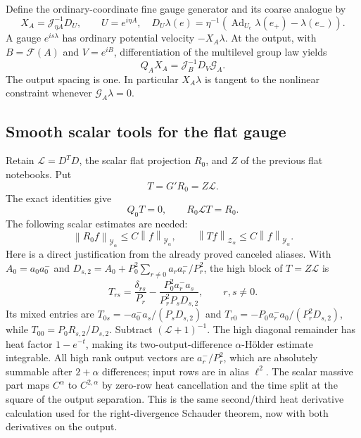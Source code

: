\documentclass[11pt]{article}
\theoremstyle{remark}
\newcommand{\norm}[1]{\left\|#1\right\|}
\begin{document}
Define the ordinary-coordinate fine gauge generator and its
coarse analogue by
\begin{equation}\label{ng-generators}
 X_A=\mathcal J_{\eta A}^{-1}D_U,
 \qquad U=e^{i\eta A},\quad
 D_U\lambda(e)=\eta^{-1}
       (\operatorname{Ad}_{U_e}\lambda(e_+)-\lambda(e_-)).
\end{equation}
A gauge $e^{is\lambda}$ has ordinary potential velocity
$-X_A\lambda$. At the output, with $B=\mathcal F(A)$ and
$V=e^{iB}$, differentiation of the multilevel group law yields
\begin{equation}\label{ng-gauge-intertwining}
 Q_AX_A=\mathcal J_B^{-1}D_V\mathcal G_A.
\end{equation}
The output spacing is one. In particular $X_A\lambda$ is tangent
to the nonlinear constraint whenever $\mathcal G_A\lambda=0$.

\subsection{Smooth scalar tools for the flat gauge}

Retain $\mathcal L=D^TD$, the scalar flat projection $R_0$, and
$Z$ of the previous flat notebooks. Put
\begin{equation}\label{ng-T-definition}
 T=G'R_0=Z\mathcal L.
\end{equation}
The exact identities give
\begin{equation}\label{ng-T-identities}
 Q_0T=0,\qquad R_0\mathcal L T=R_0.
\end{equation}
The following scalar estimates are needed:
\begin{equation}\label{ng-scalar-bounds}
 \norm{R_0f}_{\mathcal Y_\alpha}\le C\norm{f}_{\mathcal Y_\alpha},
 \qquad
 \norm{Tf}_{\mathcal Z_\alpha}\le C\norm{f}_{\mathcal Y_\alpha}.
\end{equation}
Here is a direct justification from the already proved canceled
aliases. With $A_0=a_0a_0^-$ and
$D_{s,2}=A_0+P_0^2\sum_{r\ne0}a_ra_r^-/P_r^2$, the high block of
$T=Z\mathcal L$ is
\[
 T_{rs}=\frac{\delta_{rs}}{P_r}
       -\frac{P_0^2a_r^-a_s}{P_r^2P_sD_{s,2}},\qquad r,s\ne0.
\]
Its mixed entries are
$T_{0s}=-a_0^-a_s/(P_sD_{s,2})$ and
$T_{r0}=-P_0a_r^-a_0/(P_r^2D_{s,2})$, while
$T_{00}=P_0R_{s,2}/D_{s,2}$.
Subtract $(\mathcal L+1)^{-1}$. The high diagonal remainder has
heat factor $1-e^{-t}$, making its two-output-difference
$\alpha$-H\"older estimate integrable. All high rank output
vectors are $a_r^-/P_r^2$, which are absolutely summable after
$2+\alpha$ differences; input rows are in alias $\ell^2$.
The scalar massive part maps $C^\alpha$ to $C^{2,\alpha}$ by
zero-row heat cancellation and the time split at the square of
the output separation. This is the same second/third heat
derivative calculation used for the right-divergence Schauder
theorem, now with both derivatives on the output.
\end{document}
